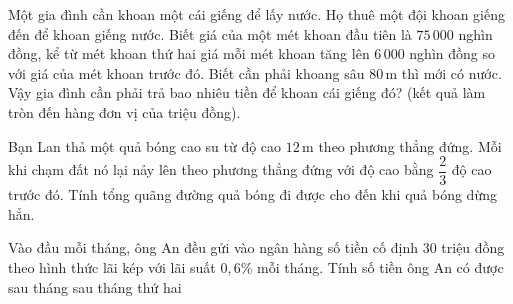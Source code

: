 \begin{bt}%

Một gia đình cần khoan một cái giếng để lấy nước. Họ thuê một đội khoan giếng đến để khoan giếng nước. Biết giá của một mét khoan đầu tiên là $75\,000$ nghìn đồng, kể từ mét khoan thứ hai giá mỗi mét khoan tăng lên $6\,000$ nghìn đồng so với giá của mét khoan trước đó. Biết cần phải khoang sâu $80\mathrm{\,m}$ thì mới có nước. Vậy gia đình cần phải trả bao nhiêu tiền để khoan cái giếng đó? (kết quả làm tròn đến hàng đơn vị của triệu đồng).
\end{bt}

\begin{bt}%

Bạn Lan thả một quả bóng cao su từ độ cao $12\mathrm{\,m}$ theo phương thẳng đứng. Mỗi khi chạm đất nó lại nảy lên theo phương thẳng đứng với độ cao bằng $\dfrac{2}{3}$ độ cao trước đó. Tính tổng quãng đường quả bóng đi được cho đến khi quả bóng dừng hẳn.
\end{bt}

\begin{bt}%
	Vào đầu mỗi tháng, ông An đều gửi vào ngân hàng số tiền cố định $30$ triệu đồng theo hình thức lãi kép với lãi suất $0{,}6\%$ mỗi tháng. Tính số tiền ông An có được sau tháng sau tháng thứ hai
\end{bt}

